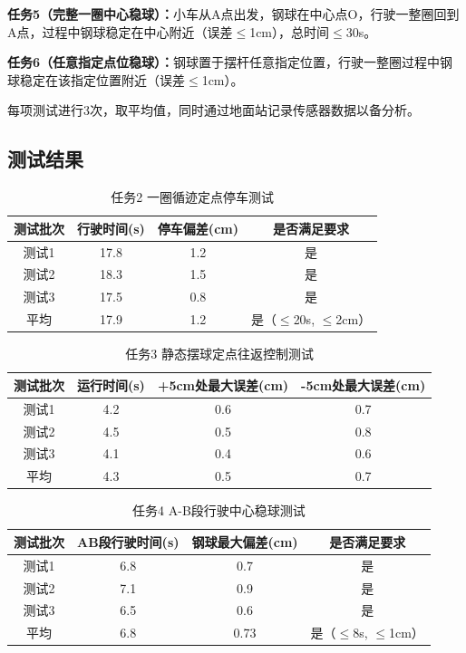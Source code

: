 \documentclass[12pt,a4paper]{ctexart}
\begin{document}
\textbf{任务5（完整一圈中心稳球）：}小车从A点出发，钢球在中心点O，行驶一整圈回到A点，过程中钢球稳定在中心附近（误差$\leq$1cm），总时间$\leq$30s。

\textbf{任务6（任意指定点位稳球）：}钢球置于摆杆任意指定位置，行驶一整圈过程中钢球稳定在该指定位置附近（误差$\leq$1cm）。

每项测试进行3次，取平均值，同时通过地面站记录传感器数据以备分析。

\subsection{\textbf{测试结果}}

\begin{table}[H]
    \centering
    \footnotesize
    \caption{任务2 一圈循迹定点停车测试}
    \label{tab:test_task2}
    \begin{tabular}{|c|c|c|c|}
        \hline
        测试批次 & 行驶时间(s) & 停车偏差(cm) & 是否满足要求 \\
        \hline
        测试1 & 17.8 & 1.2 & 是 \\
        \hline
        测试2 & 18.3 & 1.5 & 是 \\
        \hline
        测试3 & 17.5 & 0.8 & 是 \\
        \hline
        平均 & 17.9 & 1.2 & 是（$\leq$20s, $\leq$2cm） \\
        \hline
    \end{tabular}
\end{table}

\begin{table}[H]
    \centering
    \footnotesize
    \caption{任务3 静态摆球定点往返控制测试}
    \label{tab:test_task3}
    \begin{tabular}{|c|c|c|c|}
        \hline
        测试批次 & 运行时间(s) & +5cm处最大误差(cm) & -5cm处最大误差(cm) \\
        \hline
        测试1 & 4.2 & 0.6 & 0.7 \\
        \hline
        测试2 & 4.5 & 0.5 & 0.8 \\
        \hline
        测试3 & 4.1 & 0.4 & 0.6 \\
        \hline
        平均 & 4.3 & 0.5 & 0.7 \\
        \hline
    \end{tabular}
\end{table}

\begin{table}[H]
    \centering
    \footnotesize
    \caption{任务4 A-B段行驶中心稳球测试}
    \label{tab:test_task4}
    \begin{tabular}{|c|c|c|c|}
        \hline
        测试批次 & AB段行驶时间(s) & 钢球最大偏差(cm) & 是否满足要求 \\
        \hline
        测试1 & 6.8 & 0.7 & 是 \\
        \hline
        测试2 & 7.1 & 0.9 & 是 \\
        \hline
        测试3 & 6.5 & 0.6 & 是 \\
        \hline
        平均 & 6.8 & 0.73 & 是（$\leq$8s, $\leq$1cm） \\
        \hline
    \end{tabular}
\end{table}
\end{document}
